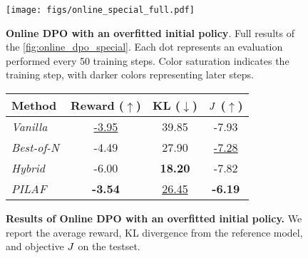 \begin{figure}[htb]
  \centering
  \begin{minipage}[t]{0.49\textwidth} %
    \vspace{0pt} %
    \centering
    \texttt{[image: figs/online\_special\_full.pdf]}
    \caption{\textbf{Online DPO with an overfitted initial policy}. Full results of the \cref{fig:online_dpo_special}. Each dot represents an evaluation performed every 50 training steps. Color saturation indicates the training step, with darker colors representing later steps.}
    \label{fig:online_dpo_special_full}
  \end{minipage}
  \hfill
  \begin{minipage}[t]{0.49\textwidth} %
    \vspace{10pt} %
    \centering
    \captionsetup{type=table}
    \caption{\textbf{Results of Online DPO with an overfitted initial policy.} We report the average reward, KL divergence from the reference model, and objective $J$ on the testset.}
    \vspace*{1.5em} %
    \begin{footnotesize}
    \begin{sc}
    \begin{tabular}{l|ccc}
    \toprule
        \textbf{Method} & Reward ($\uparrow$) & KL ($\downarrow$) & $J$ ($\uparrow$)\\ 
        \midrule
        \textit{Vanilla} & \underline{-3.95} & 39.85 & -7.93 \\
        \textit{Best-of-N} & -4.49 & {27.90}  & \underline{-7.28}\\
        \textit{Hybrid} & -6.00 & \textbf{18.20} & -7.82 \\
        \midrule
        \textit{PILAF} & \textbf{-3.54} & \underline{26.45} & \textbf{-6.19} \\
    \bottomrule
    \end{tabular}
    \end{sc}
    \end{footnotesize}
    \label{tab:online_DPO_special}
  \end{minipage}
\end{figure}